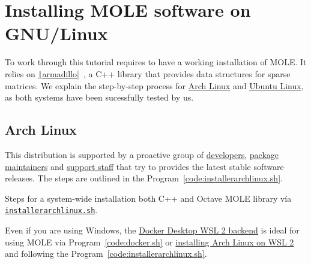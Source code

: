 \appendix

\chapter{Installing MOLE software on GNU/Linux}

To work through this tutorial requires to have a working installation
of MOLE.
It relies on
\href{https://gitlab.com/conradsnicta/armadillo-code}{\texttt|armadillo|}~\cite{Sanderson2025},
a C++ library that provides data structures for sparse matrices.
We explain the step-by-step process for
\href{https://wiki.archlinux.org/title/Pacman/Rosetta}{Arch Linux}
and \href{https://help.ubuntu.com/lts/ubuntu-help/index.html}{Ubuntu Linux},
as both systems have been sucessfully tested by us.

\section{Arch Linux}

This distribution is supported by a proactive group of
\href{https://archlinux.org/people/developers}{developers},
\href{https://archlinux.org/people/package-maintainers}{package maintainers}
and \href{https://archlinux.org/people/support-staff}{support staff}
that try to provides the latest stable software releases.
The steps are outlined in the Program~\ref{code:installerarchlinux.sh}.

\begin{listing}[ht!]
	\tiny
	\centering
	\caption{Steps for a system-wide installation both C++ and Octave
		MOLE library vía
		\href{https://raw.githubusercontent.com/carlosal1015/mole_examples/main/tutorial/installerarchlinux.sh}{\texttt{installerarchlinux.sh}}.}
	\label{code:installerarchlinux.sh}
\end{listing}

Even if you are using Windows, the
\href{https://docs.docker.com/desktop/features/wsl}{Docker Desktop WSL 2 backend}
is ideal for using MOLE via Program~\ref{code:docker.sh} or
\href{https://wiki.archlinux.org/title/Install_Arch_Linux_on_WSL}{installing Arch Linux on WSL 2} and following
the Program~\ref{code:installerarchlinux.sh}.

